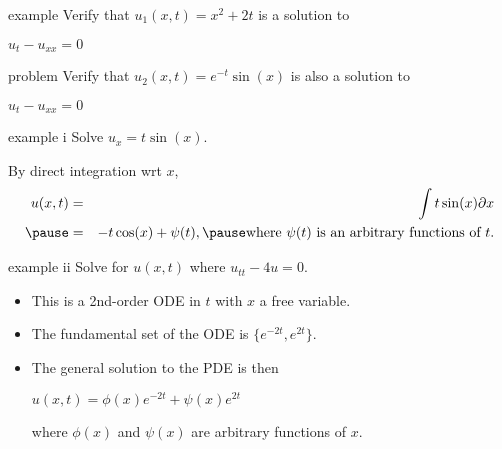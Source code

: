 \documentclass[t,10pt,fleqn]{beamer}
\def\d{\partial}
\begin{document}
\begin{frame}

\begin{block}{example}
Verify that $u_1(x,t)= x^2 +2t$ is a solution to 
      \begin{center}
                    $u_t - u_{xx}= 0$ 
      \end{center}
      
  \end{block}
  
           \pause
  
\begin{block}{problem}
Verify that $u_2(x,t)= e^{-t} \sin(x)$ is also a solution to 
      \begin{center}
                    $u_t - u_{xx}= 0$ 
      \end{center}
      
  \end{block}

  
   
 \end{frame}
\begin{frame}

\begin{block}{example i}
Solve $u_x= t \sin(x)$.
 \end{block}
  
           \pause
By direct integration wrt $x$, 
\begin{eqnarray*}
      u(x,t) & = & \int t \sin(x) \d x  \\    \pause
              & = & -t \cos(x) 
                        + \psi(t),   \pause 
                         \text{where } \psi(t) \text{ is an arbitrary functions of } t. 
\end{eqnarray*}                        
\pause

     \begin{block}{example ii}
Solve for $u(x,t)$ where $u_{tt} -4u = 0$.
 \end{block}
 
  \begin{itemize}
            \pause
            \item This is a 2nd-order ODE in $t$ with $x$ a free variable.              
            \pause
            \item The fundamental set of the ODE is $\{ e^{-2t}, e^{2t} \}$.  
            \pause
            \item The general solution to the PDE is then 
            \pause
           \begin{center}
                   $ u(x,t) = \phi(x) e^{-2t}+ \psi(x) e^{2t}$
            \end{center}
            where $\phi(x)$ and $\psi(x)$ are arbitrary functions of $x$. 
   \end{itemize}
 \end{frame}
\end{document}
